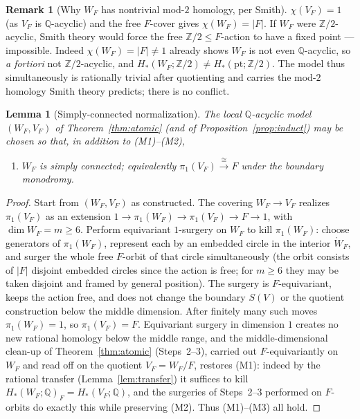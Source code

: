 \documentclass[12pt]{article}
\newtheorem{lemma}[theorem]{Lemma}
\theoremstyle{definition}
\newtheorem{remark}[theorem]{Remark}
\begin{document}
\begin{remark}[Why $W_F$ has nontrivial mod-$2$ homology, per Smith]
$\chi(V_F)=1$ (as $V_F$ is $\mathbb{Q}$-acyclic) and the free $F$-cover gives
$\chi(W_F)=|F|$. If $W_F$ were $\mathbb{Z}/2$-acyclic, Smith theory would force
the free $\mathbb{Z}/2\le F$-action to have a fixed point --- impossible. Indeed
$\chi(W_F)=|F|\neq1$ already shows $W_F$ is not even $\mathbb{Q}$-acyclic, so
\emph{a fortiori} not $\mathbb{Z}/2$-acyclic, and $H_*(W_F;\mathbb{Z}/2)\neq
H_*(\mathrm{pt};\mathbb{Z}/2)$. The model thus simultaneously is rationally
trivial after quotienting and carries the mod-$2$ homology Smith theory
predicts; there is no conflict.
\end{remark}

\begin{lemma}[Simply-connected normalization]\label{lem:simpconn}
The local $\mathbb{Q}$-acyclic model $(W_F,V_F)$ of Theorem~\ref{thm:atomic}
(and of Proposition~\ref{prop:induct}) may be chosen so that, in addition to
{\rm(M1)--(M2)},
\begin{enumerate}
\item[(M3)] $W_F$ is simply connected; equivalently $\pi_1(V_F)\xrightarrow{\ \cong\ }F$
under the boundary monodromy.
\end{enumerate}
\end{lemma}
\begin{proof}
Start from $(W_F,V_F)$ as constructed. The covering $W_F\to V_F$ realizes
$\pi_1(V_F)$ as an extension $1\to\pi_1(W_F)\to\pi_1(V_F)\to F\to1$, with
$\dim W_F=m\ge6$. Perform equivariant $1$-surgery on $W_F$ to kill
$\pi_1(W_F)$: choose generators of $\pi_1(W_F)$, represent each by an embedded
circle in the interior $\mathring W_F$, and surger the whole free $F$-orbit of
that circle simultaneously (the orbit consists of $|F|$ disjoint embedded
circles since the action is free; for $m\ge6$ they may be taken disjoint and
framed by general position). The surgery is $F$-equivariant, keeps the action
free, and does not change the boundary $S(V)$ or the quotient construction below
the middle dimension. After finitely many such moves $\pi_1(W_F)=1$, so
$\pi_1(V_F)=F$. Equivariant surgery in dimension $1$ creates no new rational
homology below the middle range, and the middle-dimensional clean-up of
Theorem~\ref{thm:atomic} (Steps~2--3), carried out $F$-equivariantly on $W_F$
and read off on the quotient $V_F=W_F/F$, restores (M1): indeed by the rational
transfer (Lemma~\ref{lem:transfer}) it suffices to kill
$H_*(W_F;\mathbb{Q})_F=H_*(V_F;\mathbb{Q})$, and the surgeries of Steps~2--3
performed on $F$-orbits do exactly this while preserving (M2). Thus
(M1)--(M3) all hold.
\end{proof}
\end{document}
